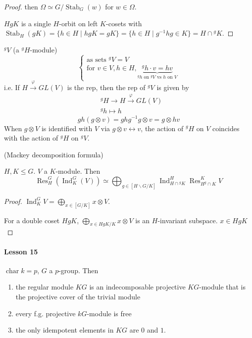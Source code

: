 \documentclass[11pt, a4paper]{report}
\begin{document}
\begin{proof}
then $\Omega \simeq G / \operatorname{Stab}_{G}(w)$ for $w \in \Omega$.

$H g K$ is a single $H$-orbit on left $K$-cosets with $\operatorname{Stab}_{H}(g K)=\{h \in H \mid h g K=g K\}=\{h \in H \mid g^{-1} h g \in K\}=H \cap {}^{g}K$.
\end{proof}

\begin{definition}
${}^{g}V$ (a ${}^{g}H$-module)
\[
\begin{cases}
\text{as sets } {}^{g}V = V \\
\text{for } v \in V, h \in H, \underbrace{{}^{g}h \cdot v = h v}_{{}^{g}h \text{ on } {}^{g}V \text{ vs } h \text{ on } V}
\end{cases}
\]
i.e. If $H \xrightarrow{\varphi} GL(V)$ is the rep, then the rep of ${}^{g}V$ is given by
\[
\begin{aligned}
& {}^{g}H \rightarrow H \xrightarrow{\varphi} GL(V) \\
& {}^{g}h \mapsto h
\end{aligned}
\]
\[
g h (g \otimes v) = g h g^{-1} g \otimes v = g \otimes h v
\]
When $g \otimes V$ is identified with $V$ via $g \otimes v \leftrightarrow v$, the action of ${}^{g}H$ on $V$ coincides with the action of ${}^{g}H$ on ${}^{g}V$.
\end{definition}

\begin{theorem}
(Mackey decomposition formula)

$H, K \leq G$. $V$ a $K$-module. Then
\[
\operatorname{Res}_{H}^{G}\left(\operatorname{Ind}_{K}^{G}(V)\right) \simeq \bigoplus_{g \in[H \backslash G / K]} \operatorname{Ind}_{H \cap {}^{g}K}^{H} \operatorname{Res}_{H^{g} \cap K}^{K} V
\]
\end{theorem}

\begin{proof}
$\operatorname{Ind}_{K}^{G} V = \bigoplus_{x \in[G / K]} x \otimes V$.

For a double coset $H g K$, $\bigoplus_{x \in HgK / K} x \otimes V$ is an $H$-invariant subspace.
$x \in H g K$
\end{proof}

\paragraph{Lesson 15}

\begin{theorem}
$\operatorname{char} k = p$, $G$ a $p$-group. Then
\begin{enumerate}
\item the regular module $K G$ is an indecomposable projective $K G$-module that is the projective cover of the trivial module
\item every f.g. projective $k G$-module is free
\item the only idempotent elements in $KG$ are $0$ and $1$.
\end{enumerate}
\end{theorem}
\end{document}
